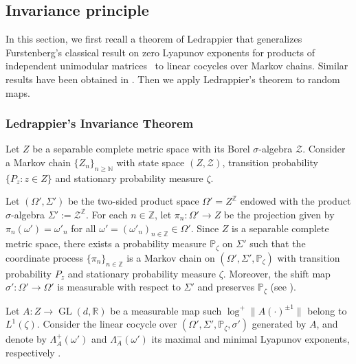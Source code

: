 \documentclass[a4paper,12pt,reqno]{amsart}
\numberwithin{equation}{section}
\newcommand{\cal}{\mathcal}
\newcommand{\ZZ}{{\cal Z}}
\newcommand{\Nn}{{\mathbb{N}}}
\newcommand{\Pp}{{\mathbb{P}}}
\newcommand{\Rr}{{\mathbb{R}}}
\newcommand{\Zz}{{\mathbb{Z}}}
\begin{document}
\subsection{Invariance principle}
In this section, we first recall a theorem of Ledrappier that generalizes Furstenberg's classical result on zero Lyapunov exponents for products of independent unimodular matrices~\cite{Furstenberg:1963uq} to linear cocycles over Markov chains. Similar results have been obtained in \cite{Royer:1980vh,Virtser:80,Guivarch:79}. Then we apply Ledrappier's theorem to random maps.

\subsubsection{Ledrappier's Invariance Theorem}

Let $Z$ be a separable complete metric space with its Borel $\sigma$-algebra $\ZZ$. Consider a Markov chain $\{Z_n\}_{n \ge \Nn}$ with state space $(Z,\ZZ)$, transition probability $\{P_z \colon z \in Z\}$ and stationary probability measure $\zeta$. 

Let $(\Omega',\Sigma')$ be the two-sided product space $\Omega'=Z^{\Zz}$ endowed with the product $\sigma$-algebra $\Sigma' := \ZZ^{\Zz}$. For each $n \in \Zz$, let $\pi_n \colon \Omega' \to Z$ be the projection given by $\pi_n(\omega')=\omega'_n$ for all $\omega'=(\omega'_n)_{n \in \Zz} \in \Omega'$. Since  $Z$ is a separable complete metric space, there exists a probability measure $\Pp_{\zeta}$ on $\Sigma'$ such that the coordinate process $\{\pi_n\}_{n \in \Zz}$ is a Markov chain on $(\Omega',\Sigma',\Pp_{\zeta})$ with transition probability $P_z$ and stationary probability measure $\zeta$. Moreover, the shift map $\sigma' \colon \Omega' \to \Omega'$ 
is measurable with respect to $\Sigma'$ and preserves $\Pp_{\zeta}$  (see \cite[Theorem 3.1.7 and Example 5.1.3]{Douc:2018wc}).

Let $A \colon Z \to \operatorname{GL}(d,\Rr)$ be a measurable map such $\log^+ \|A(\cdot)^{\pm 1}\|$ belong to $L^1(\zeta)$. Consider the linear cocycle over $(\Omega',\Sigma',\Pp_{\zeta},\sigma')$ generated by $A$, and denote by $\Lambda^+_A(\omega')$ and $\Lambda^-_A(\omega')$ its maximal and minimal Lyapunov exponents, respectively \cite{Ledrappier:1986ue}. 
\end{document}
